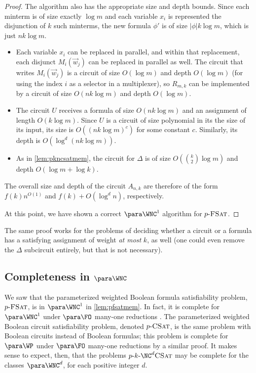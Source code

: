 \begin{proof}
  The algorithm also has the appropriate size and depth bounds.
  Since each minterm is of size exactly $\log m$ and each variable $x_i$ is represented the disjunction of $k$ such minterms, the new formula $\phi'$ is of size $|\phi| k \log m$, which is just $n k \log m$.
  \begin{itemize}
  \item
    Each variable $x_i$ can be replaced in parallel, and within that replacement, each disjunct $M_i(\vec{w}_j)$ can be replaced in parallel as well.
    The circuit that writes $M_i(\vec{w}_j)$ is a circuit of size $O(\log m)$ and depth $O(\log m)$ (for using the index $i$ as a selector in a multiplexer), so $R_{m, k}$ can be implemented by a circuit of size $O(n k \log m)$ and depth $O(\log m)$.
  \item
    The circuit $U$ receives a formula of size $O(n k \log m)$ and an assignment of length $O(k \log m)$.
    Since $U$ is a circuit of size polynomial in its the size of its input, its size is $O((n k \log m)^c)$ for some constant $c$.
    Similarly, its depth is $O(\log^d (n k \log m))$.
  \item As in \autoref{lem:pkncsatmem}, the circuit for $\Delta$ is of size $O(\binom{k}{2} \log m)$ and depth $O(\log m + \log k)$.
  \end{itemize}
  The overall size and depth of the circuit $A_{n, k}$ are therefore of the form $f(k) n^{O(1)}$ and $f(k) + O(\log^d n)$, respectively.

  At this point, we have shown a correct $\para \WNC^1$ algorithm for $p \textnormal{-} \textsc{FSat}$.
\end{proof}

The same proof works for the problems of deciding whether a circuit or a formula has a satisfying assignment of weight \emph{at most} $k$, as well (one could even remove the $\Delta$ subcircuit entirely, but that is not necessary).

\subsection{Completeness in \texorpdfstring{$\para \WNC$}{paraWNC}}
\label{sec:parawnccompleteness}

We saw that the parameterized weighted Boolean formula satisfiability problem, $p \textnormal{-} \textsc{FSat}$, is in $\para \WNC^1$ in \autoref{lem:pfsatmem}.
In fact, it is complete for $\para \WNC^1$ under $\para \FO$ many-one reductions \autocite[Theorem~3.6]{est15}.
The parameterized weighted Boolean circuit satisfiability problem, denoted $p \textnormal{-} \textsc{CSat}$, is the same problem with Boolean circuits instead of Boolean formulas; this problem is complete for $\para \WP$ under $\para \FO$ many-one reductions by a similar proof.
It makes sense to expect, then, that the problems $\pNCSAT$ may be complete for the classes $\para \WNC^d$, for each positive integer $d$.

